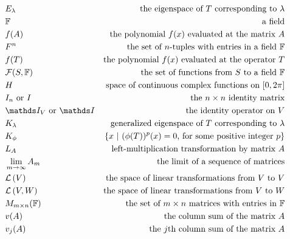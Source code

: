 \begin{align*}
	 & E_\lambda              & \text{the eigenspace of $T$ corresponding to $\lambda$}               \\
	 & \F                     & \text{a field}                                                        \\
	 & f(A)                   & \text{the polynomial $f(x)$ evaluated at the matrix $A$}              \\
	 & F^n                    & \text{the set of $n$-tuples with entries in a field $\F$}             \\
	 & f(T)                   & \text{the polynomial $f(x)$ evaluated at the operator $T$}            \\
	 & \mathcal{F}(S,\F)      & \text{the set of functions from $S$ to a field $\F$}                  \\
	 & H                      & \text{space of continuous complex functions on $[0, 2\pi]$}           \\
	 & I_n \text{ or } I      & \text{the $n \times n$ identity matrix}                               \\
	 & \Id_V \text{ or } \Id  & \text{the identity operator on $V$}                                   \\
	 & K_\lambda              & \text{generalized eigenspace of $T$ corresponding to $\lambda$}       \\
	 & K_\phi                 & \{x\ |\ (\phi(T))^p(x) = 0 \text{, for some positive integer $p$}\}   \\
	 & L_A                    & \text{left-multiplication transformation by matrix $A$}               \\
	 & \lim_{m \to \infty}A_m & \text{the limit of a sequence of matrices}                            \\
	 & \linear{V}             & \text{the space of linear transformations from $V$ to $V$}            \\
	 & \linear{V, W}          & \text{the space of linear transformations from $V$ to $W$}            \\
	 & M_{m \times n}(\F)     & \text{the set of $m \times n$ matrices with entries in $\F$}          \\
	 & v(A)                   & \text{the column sum of the matrix $A$}                               \\
	 & v_j(A)                 & \text{the $j$th column sum of the matrix $A$}                         \\

\end{align*}
